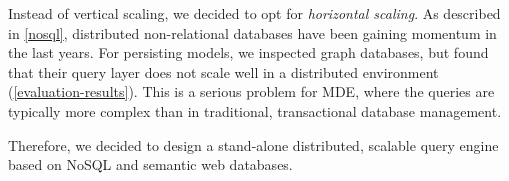 Instead of vertical scaling, we decided to opt for \emph{horizontal scaling}. As described in \autoref{nosql}, distributed non-relational databases have been gaining momentum in the last years. For persisting models, we inspected graph databases, but found that their query layer does not scale well in a distributed environment (\autoref{evaluation-results}). This is a serious problem for MDE, where the queries are typically more complex than in traditional, transactional database management.

Therefore, we decided to design a stand-alone distributed, scalable query engine based on NoSQL and semantic web databases.






% 
% 

